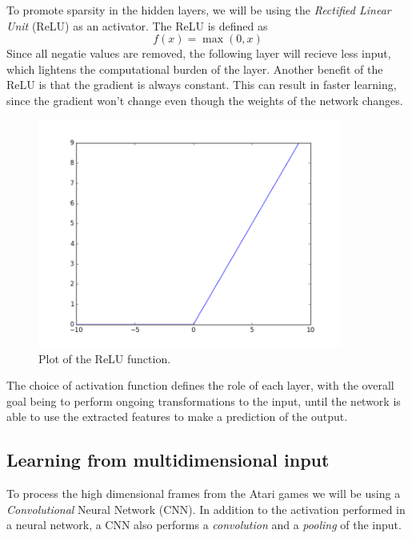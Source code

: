 \documentclass[11pt]{article}
\begin{document}
To promote sparsity in the hidden layers, we will be using the \textit{Rectified
Linear Unit} (ReLU) as an activator.
The ReLU is defined as
\begin{equation}
    f(x) = \max(0,x)
\end{equation}
Since all negatie values are removed, the following layer will recieve less
input, which lightens the computational burden of the layer.
Another benefit of the ReLU is that the gradient is always constant.
This can result in faster learning, since the gradient won't change even
though the weights of the network changes.
\begin{figure}[!h]
    \centering
    \includegraphics[width=10cm]{include/relu.png}
    \caption{Plot of the ReLU function.}
    \label{fig:relu}
\end{figure}

The choice of activation function defines the role of each layer,
with the overall goal being to perform ongoing transformations
to the input, until the network is able to use the extracted
features to make a prediction of the output.

\subsection{Learning from multidimensional input}

To process the high dimensional frames from the Atari games we will be using
a \textit{Convolutional} Neural Network (CNN).
In addition to the activation performed in a neural network, a CNN
also performs a \textit{convolution} and a \textit{pooling} of the input.
\end{document}
